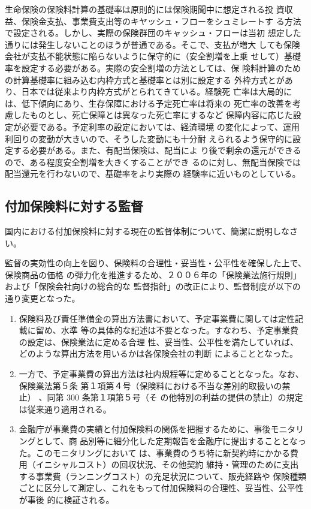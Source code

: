 \documentclass[report,gutter=10mm,fore-edge=10mm,uplatex,dvipdfmx]{jlreq}
\begin{document}
生命保険の保険料計算の基礎率は原則的には保険期聞中に想定される投
資収益、保険金支払、事業費支出等のキヤッシュ・フローをシュミレートす
る方法で設定される。しかし、実際の保険群団のキャッシュ・フローは当初
想定した通りには発生しないことのほうが普通である。そこで、支払が増大
しても保険会社が支払不能状態に陥らないように保守的に（安全割増を上乗
せして）基礎率を設定する必要がある。実際の安全割増の方法としては、保
険料計算のための計算基礎率に組み込む内枠方式と基礎率とは別に設定する
外枠方式とがあり、日本では従来より内枠方式がとられてきている。経験死
亡率は大局的には、低下傾向にあり、生存保障における予定死亡率は将来の
死亡率の改善を考慮したものとし、死亡保障とは異なった死亡率にするなど
保障内容に応じた設定が必要である。予定利率の設定においては、経済環境
の変化によって、運用利回りの変動が大きいので、そうした変動にも十分耐
えられるよう保守的に設定する必要がある。また、有配当保険は、配当によ
り後で剰余の還元ができるので、ある程度安全割増を大きくすることができ
るのに対し、無配当保険では配当還元を行わないので、基礎率をより実際の
経験率に近いものとしている。

\subsection{付加保険料に対する監督}


国内における付加保険料に対する現在の監督体制について、簡潔に説明しなさい。



監督の実効性の向上を図り、保険料の合理性・妥当性・公平性を確保した上で、保険商品の価格
の弾力化を推進するため、２００６年の「保険業法施行規則」および「保険会社向けの総合的な
監督指針」の改正により、監督制度が以下の通り変更となった。
\begin{enumerate}
 \item 保険料及び責任準備金の算出方法書において、予定事業費に関しては定性記載に留め、水準
等の具体的な記述は不要となった。すなわち、予定事業費の設定は、保険業法に定める合理
性、妥当性、公平性を満たしていれば、どのような算出方法を用いるかは各保険会社の判断
によることとなった。
 \item 一方で、予定事業費の算出方法は社内規程等に定めることとなった。なお、保険業法第５条
第１項第４号（保険料における不当な差別的取扱いの禁止）
、同第 300 条第１項第５号（そ
の他特別の利益の提供の禁止）の規定は従来通り適用される。
 \item 金融庁が事業費の実績と付加保険料の関係を把握するために、事後モニタリングとして、商
品別等に細分化した定期報告を金融庁に提出することとなった。このモニタリングにおいて
は、事業費のうち特に新契約時にかかる費用（イニシャルコスト）の回収状況、その他契約
維持・管理のために支出する事業費（ランニングコスト）の充足状況について、販売経路や
保険種類ごとに区分して測定し、これをもって付加保険料の合理性、妥当性、公平性が事後
的に検証される。
\end{enumerate}
\end{document}
